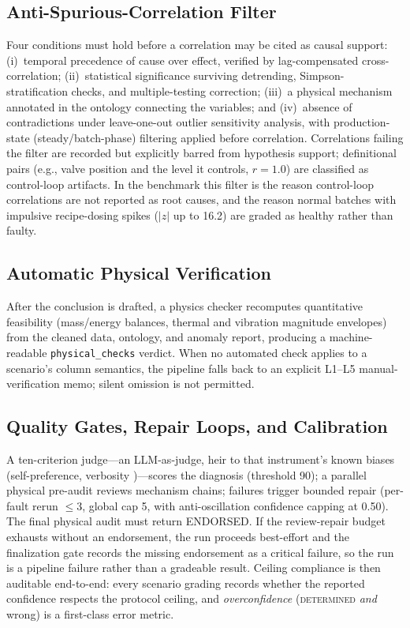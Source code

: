 \documentclass[preprint,10pt]{elsarticle}
\begin{document}
\subsection{Anti-Spurious-Correlation Filter}
Four conditions must hold before a correlation may be cited as causal support: (i)~temporal precedence of cause over effect, verified by lag-compensated cross-correlation; (ii)~statistical significance surviving detrending, Simpson-stratification checks, and multiple-testing correction; (iii)~a physical mechanism annotated in the ontology connecting the variables; and (iv)~absence of contradictions under leave-one-out outlier sensitivity analysis, with production-state (steady/batch-phase) filtering applied before correlation. Correlations failing the filter are recorded but explicitly barred from hypothesis support; definitional pairs (e.g., valve position and the level it controls, $r\!=\!1.0$) are classified as control-loop artifacts. In the benchmark this filter is the reason control-loop correlations are not reported as root causes, and the reason normal batches with impulsive recipe-dosing spikes ($|z|$ up to 16.2) are graded as healthy rather than faulty.

\subsection{Automatic Physical Verification}
After the conclusion is drafted, a physics checker recomputes quantitative feasibility (mass/energy balances, thermal and vibration magnitude envelopes) from the cleaned data, ontology, and anomaly report, producing a machine-readable \texttt{physical\_checks} verdict. When no automated check applies to a scenario's column semantics, the pipeline falls back to an explicit L1--L5 manual-verification memo; silent omission is not permitted.

\subsection{Quality Gates, Repair Loops, and Calibration}
A ten-criterion judge---an LLM-as-judge, heir to that instrument's known biases (self-preference, verbosity \cite{zheng2023judging,panickssery2024selfpref})---scores the diagnosis (threshold 90); a parallel physical pre-audit reviews mechanism chains; failures trigger bounded repair (per-fault rerun $\le$3, global cap 5, with anti-oscillation confidence capping at 0.50). The final physical audit must return ENDORSED. If the review-repair budget exhausts without an endorsement, the run proceeds best-effort and the finalization gate records the missing endorsement as a critical failure, so the run is a pipeline failure rather than a gradeable result. Ceiling compliance is then auditable end-to-end: every scenario grading records whether the reported confidence respects the protocol ceiling, and \emph{overconfidence} (\mbox{\textsc{determined}} \emph{and} wrong) is a first-class error metric.
\end{document}
